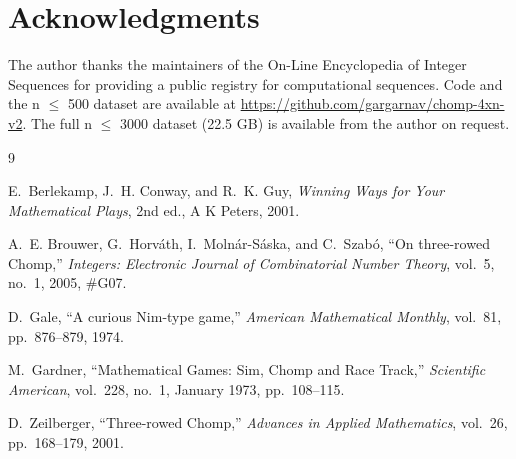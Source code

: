 \documentclass[12pt]{article}
\begin{document}
\section*{Acknowledgments}

The author thanks the maintainers of the On-Line Encyclopedia of
Integer Sequences for providing a public registry for computational
sequences.
Code and the n $\leq$ 500 dataset are available at
\url{https://github.com/gargarnav/chomp-4xn-v2}.
The full n $\leq$ 3000 dataset (22.5 GB) is available from the author on request.

\begin{thebibliography}{9}

E.~Berlekamp, J.~H. Conway, and R.~K. Guy,
\textit{Winning Ways for Your Mathematical Plays}, 2nd ed.,
A K Peters, 2001.

A.~E. Brouwer, G.~Horv{\'a}th, I.~Moln{\'a}r-S{\'a}ska,
and C.~Szab{\'o},
``On three-rowed Chomp,''
\textit{Integers: Electronic Journal of Combinatorial Number Theory},
vol.~5, no.~1, 2005, \#G07.

D.~Gale,
``A curious Nim-type game,''
\textit{American Mathematical Monthly},
vol.~81, pp.~876--879, 1974.

M.~Gardner,
``Mathematical Games: Sim, Chomp and Race Track,''
\textit{Scientific American},
vol.~228, no.~1, January 1973, pp.~108--115.

D.~Zeilberger,
``Three-rowed Chomp,''
\textit{Advances in Applied Mathematics},
vol.~26, pp.~168--179, 2001.

\end{thebibliography}
\end{document}
